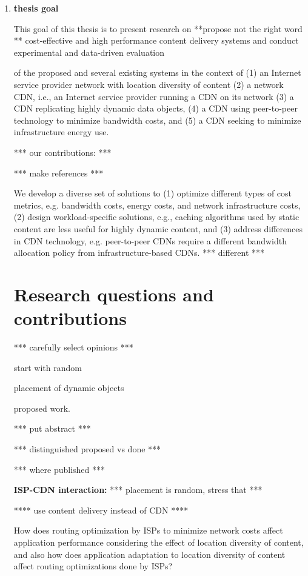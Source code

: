 \begin{enumerate}
\item
\textbf{thesis goal}

This goal of this thesis is to present research on  **propose not the right word ** cost-effective and high performance content delivery systems  and 
conduct experimental and data-driven evaluation 

of the proposed and several existing systems in the context of (1) an Internet service provider network with location diversity of content  (2) a network CDN, i.e., an Internet service provider running a CDN on its network (3) a CDN replicating highly dynamic data objects, (4) a CDN using peer-to-peer technology to minimize bandwidth costs, and  (5) a CDN seeking to minimize infrastructure energy use.

*** our contributions:   ***

*** make references ***


We develop a diverse set of solutions to (1) optimize different types of  cost metrics, e.g. bandwidth costs, energy costs, and network infrastructure costs, (2) design workload-specific solutions, e.g., caching algorithms used by static content are less useful for highly dynamic content, and (3) address differences in CDN technology, e.g. peer-to-peer CDNs require a different bandwidth allocation policy from infrastructure-based CDNs. *** different ***



\section{Research questions and contributions}
\label{sec:contribution}



*** carefully select opinions ***

start with random 

placement of dynamic objects



proposed work.

 

*** put abstract ***


*** distinguished proposed vs done ***

*** where published ***


\textbf{ISP-CDN interaction:} *** placement is random, stress that ***

**** use content delivery instead of CDN ****


How does routing optimization by ISPs to minimize network costs affect application performance considering the effect of location diversity of content, and also how does application adaptation to location diversity of content affect routing optimizations done by ISPs?



\end{enumerate}
